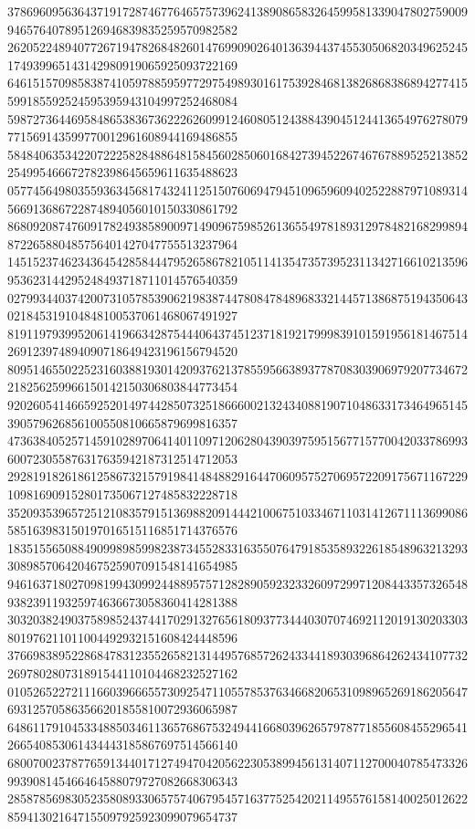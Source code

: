 \begin{DoxyCode}
      378696095636437191728746776465757396241389086583264599581339047802759009946576407895126946839835259570982582
      262052248940772671947826848260147699090264013639443745530506820349625245174939965143142980919065925093722169
      646151570985838741059788595977297549893016175392846813826868386894277415599185592524595395943104997252468084
      598727364469584865383673622262609912460805124388439045124413654976278079771569143599770012961608944169486855
      584840635342207222582848864815845602850601684273945226746767889525213852254995466672782398645659611635488623
      057745649803559363456817432411251507606947945109659609402522887971089314566913686722874894056010150330861792
      868092087476091782493858900971490967598526136554978189312978482168299894872265880485756401427047755513237964
      145152374623436454285844479526586782105114135473573952311342716610213596953623144295248493718711014576540359
      027993440374200731057853906219838744780847848968332144571386875194350643021845319104848100537061468067491927
      819119793995206141966342875444064374512371819217999839101591956181467514269123974894090718649423196156794520
      809514655022523160388193014209376213785595663893778708303906979207734672218256259966150142150306803844773454
      920260541466592520149744285073251866600213243408819071048633173464965145390579626856100550810665879699816357
      473638405257145910289706414011097120628043903975951567715770042033786993600723055876317635942187312514712053
      292819182618612586732157919841484882916447060957527069572209175671167229109816909152801735067127485832228718
      352093539657251210835791513698820914442100675103346711031412671113699086585163983150197016515116851714376576
      183515565088490998985998238734552833163550764791853589322618548963213293308985706420467525907091548141654985
      946163718027098199430992448895757128289059232332609729971208443357326548938239119325974636673058360414281388
      303203824903758985243744170291327656180937734440307074692112019130203303801976211011004492932151608424448596
      376698389522868478312355265821314495768572624334418930396864262434107732269780280731891544110104468232527162
      010526522721116603966655730925471105578537634668206531098965269186205647693125705863566201855810072936065987
      648611791045334885034611365768675324944166803962657978771855608455296541266540853061434443185867697514566140
      680070023787765913440171274947042056223053899456131407112700040785473326993908145466464588079727082668306343
      285878569830523580893306575740679545716377525420211495576158140025012622859413021647155097925923099079654737

\end{DoxyCode}
